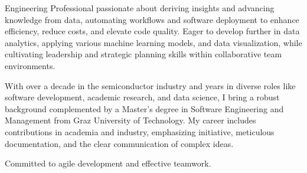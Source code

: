 \documentclass[a4paper]{./src/resume-cv}
\begin{document}
\lastupdated


\begin{minipage}[t]{\textwidth}
    \begin{onecolumncventry}[0.94]
    Engineering Professional passionate about deriving insights and advancing knowledge from data, automating workflows and software deployment to enhance efficiency, reduce costs, and elevate code quality. Eager to develop further in data analytics, applying various machine learning models, and data visualization, while cultivating leadership and strategic planning skills within collaborative team environments.
    \subsectionsep

    With over a decade in the semiconductor industry and years in diverse roles like software development, academic research, and data science, I bring a robust background complemented by a Master’s degree in Software Engineering and Management from Graz University of Technology. My career includes contributions in academia and industry, emphasizing initiative, meticulous documentation, and the clear communication of complex ideas.
    \subsectionsep

    \par Committed to agile development and effective teamwork.
   
    \end{onecolumncventry}

    \negsubsectionsep
    

\end{minipage}
\end{document}
